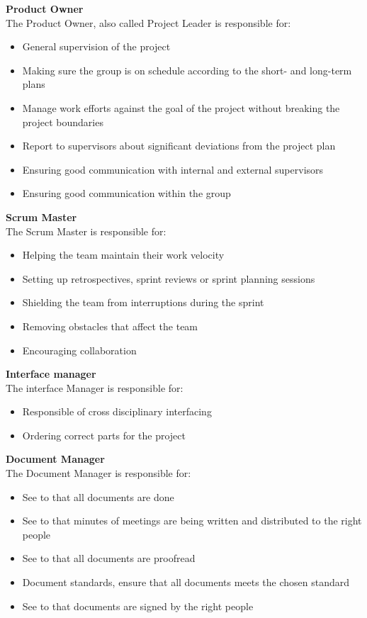 \textbf{Product Owner}\\
The Product Owner, also called Project Leader is responsible for: 
\begin{itemize}
  \item General supervision of the project
  \item Making sure the group is on schedule according to the short- and long-term plans
  \item Manage work efforts against the goal of the project without breaking the project boundaries 
  \item Report to supervisors about significant deviations from the project plan
  \item Ensuring good communication with internal and external supervisors
  \item Ensuring good communication within the group
\end{itemize}
\bigskip
\textbf{Scrum Master}\\
The Scrum Master is responsible for: 
\begin{itemize}
  \item Helping the team maintain their work velocity
  \item Setting up retrospectives, sprint reviews or sprint planning sessions
  \item Shielding the team from interruptions during the sprint
  \item Removing obstacles that affect the team
  \item Encouraging collaboration
\end{itemize}
\bigskip
\textbf{Interface manager}\\
The interface Manager is responsible for:
\begin{itemize}
  \item Responsible of cross disciplinary interfacing
  \item Ordering correct parts for the project
\end{itemize}
\bigskip
\textbf{Document Manager}\\
The Document Manager is responsible for:
\begin{itemize}
  \item See to that all documents are done
  \item See to that minutes of meetings are being written and distributed to the right people
  \item See to that all documents are proofread
  \item Document standards, ensure that all documents meets the chosen standard 
  \item See to that documents are signed by the right people
\end{itemize}
